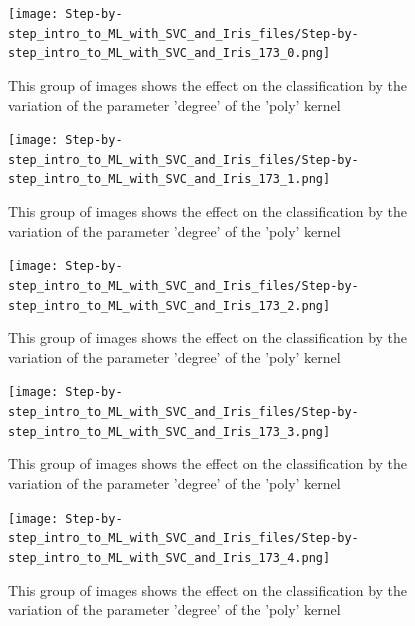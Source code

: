 \documentclass [oneside,10pt,a4paper,ngerman,BCOR10mm,headsepline,parindent,final]{scrartcl}
\begin{document}
    \begin{figure}
        \begin{center}\texttt{[image: Step-by-step\_intro\_to\_ML\_with\_SVC\_and\_Iris\_files/Step-by-step\_intro\_to\_ML\_with\_SVC\_and\_Iris\_173\_0.png]}\end{center}
        \caption{This group of images shows the effect on the classification by the variation of the parameter 'degree' of the 'poly' kernel}
        \label{fig:vary_degree_parameter}
    \end{figure}
    
    \begin{figure}
        \begin{center}\texttt{[image: Step-by-step\_intro\_to\_ML\_with\_SVC\_and\_Iris\_files/Step-by-step\_intro\_to\_ML\_with\_SVC\_and\_Iris\_173\_1.png]}\end{center}
        \caption{This group of images shows the effect on the classification by the variation of the parameter 'degree' of the 'poly' kernel}
        \label{fig:vary_degree_parameter}
    \end{figure}
    
    \begin{figure}
        \begin{center}\texttt{[image: Step-by-step\_intro\_to\_ML\_with\_SVC\_and\_Iris\_files/Step-by-step\_intro\_to\_ML\_with\_SVC\_and\_Iris\_173\_2.png]}\end{center}
        \caption{This group of images shows the effect on the classification by the variation of the parameter 'degree' of the 'poly' kernel}
        \label{fig:vary_degree_parameter}
    \end{figure}
    
    \begin{figure}
        \begin{center}\texttt{[image: Step-by-step\_intro\_to\_ML\_with\_SVC\_and\_Iris\_files/Step-by-step\_intro\_to\_ML\_with\_SVC\_and\_Iris\_173\_3.png]}\end{center}
        \caption{This group of images shows the effect on the classification by the variation of the parameter 'degree' of the 'poly' kernel}
        \label{fig:vary_degree_parameter}
    \end{figure}
    
    \begin{figure}
        \begin{center}\texttt{[image: Step-by-step\_intro\_to\_ML\_with\_SVC\_and\_Iris\_files/Step-by-step\_intro\_to\_ML\_with\_SVC\_and\_Iris\_173\_4.png]}\end{center}
        \caption{This group of images shows the effect on the classification by the variation of the parameter 'degree' of the 'poly' kernel}
        \label{fig:vary_degree_parameter}
    \end{figure}
    
\end{document}
